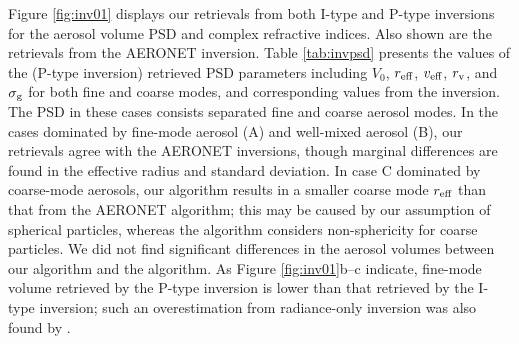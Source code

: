 Figure \ref{fig:inv01} displays our retrievals from both I-type and P-type 
inversions for the aerosol volume PSD and complex refractive indices. 
Also shown are the retrievals from the AERONET \Dub inversion. 
Table \ref{tab:invpsd} presents the values of the (P-type inversion) retrieved
PSD parameters including $V_0$, $r_\text{eff}$, $v_\text{eff}$, $r_\text{v}$, and $\sigma_\text{g}$ for both 
fine and coarse modes, and corresponding values from the \Dub inversion. 
The PSD in these cases consists separated fine and coarse aerosol modes. 
In the cases dominated by fine-mode aerosol (A) and
well-mixed aerosol (B), our retrievals agree with the AERONET inversions,
though marginal differences are found in the effective radius and standard
deviation. In case C dominated by coarse-mode aerosols, our algorithm results
in a smaller coarse mode $r_\text{eff}$ than that from the AERONET algorithm; this may
be caused by our assumption of spherical particles, whereas the \Dub
algorithm considers non-sphericity for coarse particles. We did not find
significant differences in the aerosol volumes between our algorithm and the
\Dub algorithm. As Figure \ref{fig:inv01}b--c indicate, fine-mode volume 
retrieved by the P-type inversion is lower than that retrieved by the 
I-type inversion; such an overestimation from radiance-only inversion was 
also found by \citet{Li09}.

